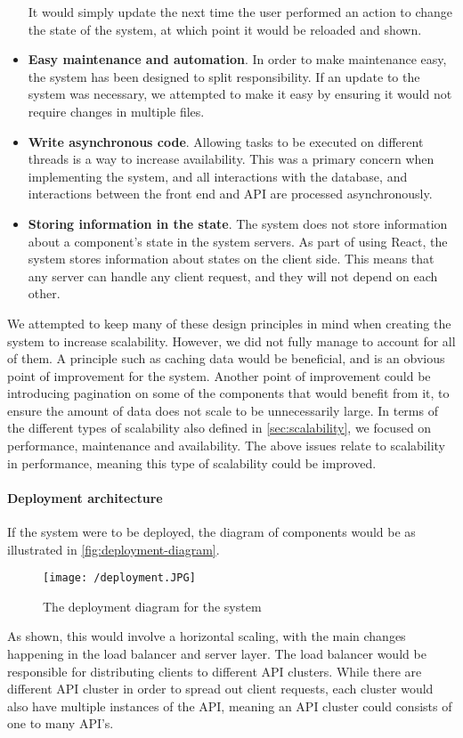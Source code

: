 \begin{itemize}
    It would simply update the next time the user performed an action to change the state of the system, at which point it would be reloaded and shown.
    \item \textbf{Easy maintenance and automation}. In order to make maintenance easy, the system has been designed to split responsibility.
    If an update to the system was necessary, we attempted to make it easy by ensuring it would not require changes in multiple files.
    \item \textbf{Write asynchronous code}. Allowing tasks to be executed on different threads is a way to increase availability. 
    This was a primary concern when implementing the system, and all interactions with the database, and interactions between the front end and API are processed asynchronously.
    \item \textbf{Storing information in the state}. The system does not store information about a component's state in the system servers.
    As part of using React, the system stores information about states on the client side.
    This means that any server can handle any client request, and they will not depend on each other.
\end{itemize}
We attempted to keep many of these design principles in mind when creating the system to increase scalability.
However, we did not fully manage to account for all of them.
A principle such as caching data would be beneficial, and is an obvious point of improvement for the system.
Another point of improvement could be introducing pagination on some of the components that would benefit from it, to ensure the amount of data does not scale to be unnecessarily large.
In terms of the different types of scalability also defined in \autoref{sec:scalability}, we focused on performance, maintenance and availability.
The above issues relate to scalability in performance, meaning this type of scalability could be improved.

\paragraph{Deployment architecture}
If the system were to be deployed, the diagram of components would be as illustrated in \autoref{fig:deployment-diagram}.
\begin{figure}[H]
    \texttt{[image: /deployment.JPG]}
     \caption{The deployment diagram for the system}
     \label{fig:deployment-diagram}
 \end{figure}
 \noindent
As shown, this would involve a horizontal scaling, with the main changes happening in the load balancer and server layer.
The load balancer would be responsible for distributing clients to different API clusters.
While there are different API cluster in order to spread out client requests, each cluster would also have multiple instances of the API, meaning an API cluster could consists of one to many API's.
